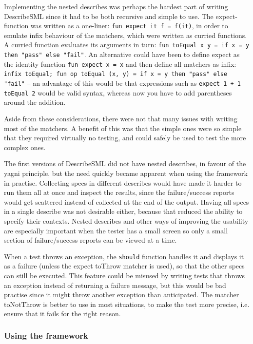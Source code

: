 \documentclass[11pt]{article}
\begin{document}
Implementing the nested describes was perhaps the hardest part of writing DescribeSML since it had to be both recursive and simple to use. The expect-function was written as a one-liner: \texttt{fun expect it f = f(it)}, in order to emulate infix behaviour of the matchers, which were written as curried functions. A curried function evaluates its arguments in turn: \texttt{fun toEqual x y = if x = y then "pass" else "fail"}. An alternative could have been to define expect as the identity function \texttt{fun expect x = x} and then define all matchers as infix: \texttt{infix toEqual; fun op toEqual (x, y) = if x = y then "pass" else "fail"} -- an advantage of this would be that expressions such as \texttt{expect 1 + 1 toEqual 2} would be valid syntax, whereas now you have to add parentheses around the addition.

Aside from these considerations, there were not that many issues with writing most of the matchers. A benefit of this was that the simple ones were so simple that they required virtually no testing, and could safely be used to test the more complex ones.

The first versions of DescribeSML did not have nested describes, in favour of the \gls{yagni} principle, but the need quickly became apparent when using the framework in practise. Collecting specs in different describes would have made it harder to run them all at once and inspect the results, since the failure/success reports would get scattered instead of collected at the end of the output. Having all specs in a single describe was not desirable either, because that reduced the ability to specify their contexts. Nested describes and other ways of improving the usability are especially important when the tester has a small screen so only a small section of failure/success reports can be viewed at a time.

When a test throws an exception, the \texttt{should} function handles it and displays it as a failure (unless the expect toThrow matcher is used), so that the other specs can still be executed. This feature could be misused by writing tests that throws an exception instead of returning a failure message, but this would be bad practise since it might throw another exception than anticipated. The matcher toNotThrow is better to use in most situations, to make the test more precise, i.e. ensure that it fails for the right reason.

\subsubsection{Using the framework}
\end{document}
